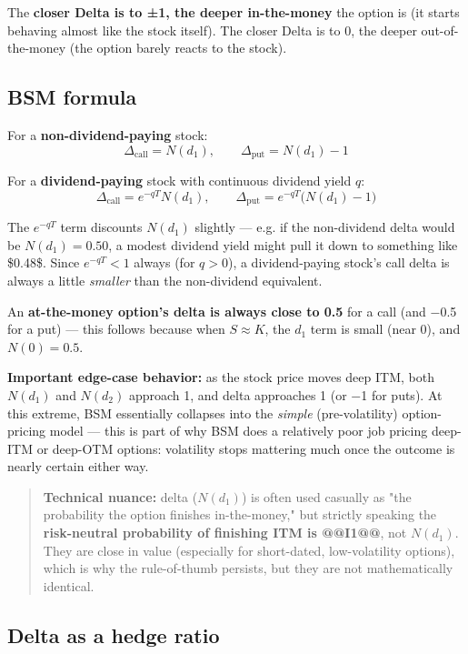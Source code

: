 \documentclass[12pt,openany]{book}
\theoremstyle{definition}
\theoremstyle{remark}
\begin{document}
The \textbf{closer Delta is to ±1, the deeper in-the-money} the option is (it starts behaving almost like the stock itself). The closer Delta is to 0, the deeper out-of-the-money (the option barely reacts to the stock).

\subsection{BSM formula}

For a \textbf{non-dividend-paying} stock:
\[
\Delta_{\text{call}} = N(d_1), \qquad \Delta_{\text{put}} = N(d_1) - 1
\]

For a \textbf{dividend-paying} stock with continuous dividend yield \(q\):
\[
\Delta_{\text{call}} = e^{-qT}N(d_1), \qquad \Delta_{\text{put}} = e^{-qT}\big(N(d_1) - 1\big)
\]

The \(e^{-qT}\) term discounts \(N(d_1)\) slightly — e.g. if the non-dividend delta would be \(N(d_1)=0.50\), a modest dividend yield might pull it down to something like \$0.48\$. Since \(e^{-qT} < 1\) always (for \(q>0\)), a dividend-paying stock's call delta is always a little \emph{smaller} than the non-dividend equivalent.

An \textbf{at-the-money option's delta is always close to 0.5} for a call (and −0.5 for a put) — this follows because when \(S \approx K\), the \(d_1\) term is small (near 0), and \(N(0) = 0.5\).

\textbf{Important edge-case behavior:} as the stock price moves deep ITM, both \(N(d_1)\) and \(N(d_2)\) approach 1, and delta approaches 1 (or −1 for puts). At this extreme, BSM essentially collapses into the \emph{simple} (pre-volatility) option-pricing model — this is part of why BSM does a relatively poor job pricing deep-ITM or deep-OTM options: volatility stops mattering much once the outcome is nearly certain either way.

\begin{quote}
\textbf{Technical nuance:} delta (\(N(d_1)\)) is often used casually as "the probability the option finishes in-the-money," but strictly speaking the \textbf{risk-neutral probability of finishing ITM is @@I1@@}, not \(N(d_1)\). They are close in value (especially for short-dated, low-volatility options), which is why the rule-of-thumb persists, but they are not mathematically identical.
\end{quote}

\subsection{Delta as a hedge ratio}
\end{document}
